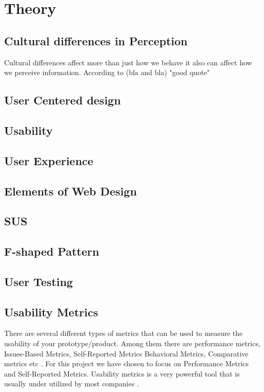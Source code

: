 
\chapter{Theory} %

\label{Chapter1} %




\section{Cultural differences in Perception}
Cultural differences affect more than just how we behave it also can affect how we perceive information. According to (bla and bla) "good quote" \cite{Holistic_vs_Analytic}
\section{User Centered design}
\section{Usability}
\section{User Experience}
\section{Elements of Web Design}
\section{SUS}
\section{F-shaped Pattern}
\section{User Testing}
\section{Usability Metrics}
There are several different types of metrics that can be used to measure the usability of your prototype/product. Among them there are performance metrics, Issues-Based Metrics, Self-Reported Metrics Behavioral Metrics, Comparative metrics etc \cite{tullis_albert_2011}. For this project we have chosen to focus on Performance Metrics and Self-Reported Metrics. Usability metrics is a very powerful tool that is usually under utilized by most companies \cite{norman_metrics}. 
